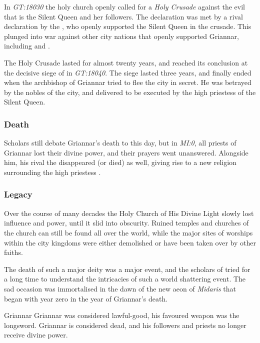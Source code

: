 In \emph{GT:18030} the holy church openly called for a \emph{Holy Crusade}
against the evil that is the Silent Queen and her followers. The declaration
was met by a rival declaration by the , who openly
supported the Silent Queen in the crusade. This plunged 
into war against other city nations that openly supported Griannar, including
 and .

The Holy Crusade lasted for almost twenty years, and reached its conclusion
at the decisive siege of  in \emph{GT:18040}. The
siege lasted three years, and finally ended when the archbishop of Griannar
tried to flee the city in secret. He was betrayed by the nobles of the city,
and delivered to be executed by the high priestess  of the
Silent Queen.

\subsubsection{Death}

Scholars still debate Griannar's death to this day, but in \emph{MI:0}, all
priests of Griannar lost their divine power, and their prayers went
unanswered. Alongside him, his rival the  disappeared
(or died) as well, giving rise to a new religion surrounding the high priestess
.

\subsubsection{Legacy}

Over the course of many decades the Holy Church of His Divine Light slowly
lost influence and power, until it slid into obscurity. Ruined temples and
churches of the church can still be found all over the world, while the major
sites of worships within the city kingdoms were either demolished or have been
taken over by other faiths.

The death of such a major deity was a major event, and the scholars of
 tried for a long time to understand the
intricacies of such a world shattering event. The sad occasion was
immortalised in the dawn of the new aeon of \emph{Midaris} that began with
year zero in the year of Griannar's death.

\begin{35e}{Griannar}
  Griannar was considered lawful-good, his favoured weapon was the longsword.
  Griannar is considered dead, and his followers and priests no longer receive
  divine power.
\end{35e}
